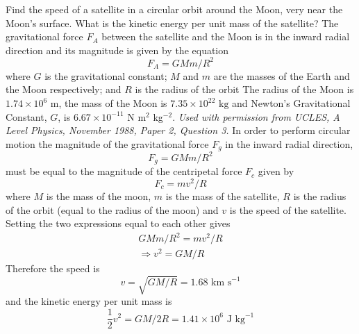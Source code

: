 \begin{hint}
{Find the speed of a satellite in a circular orbit around the Moon, very near the Moon's surface. What is the kinetic energy per unit mass of the satellite?
The gravitational force $F_A$ between the satellite and the Moon is in the inward radial direction and its magnitude is given by the equation 
\begin{equation*}
F_A=GMm/R^2
\end{equation*}
where $G$ is the gravitational constant; $M$ and $m$ are the masses of the Earth and the Moon respectively; and $R$ is the radius of the orbit}
{The radius of the Moon is $1.74\times 10^6\textrm{ m}$, the mass of the Moon is $7.35\times 10^{22}\textrm{ kg}$ and Newton's Gravitational Constant, $G$, is $6.67 \times 10^{-11}$ N m$^{2}$ kg$^{-2}$.}
{\textit{Used with permission from UCLES, A Level Physics, November 1988, Paper 2, Question 3.}}
{In order to perform circular motion the magnitude of the gravitational force $F_g$ in the inward radial direction, 
\begin{equation*} F_g=GMm/R^2 \end{equation*}
must be equal to the magnitude of the centripetal force $F_c$ given by 
\begin{equation*} F_c=mv^2/R \end{equation*}
where $M$ is the mass of the moon, $m$ is the mass of the satellite, $R$ is the radius of the orbit (equal to the radius of the moon) and $v$ is the speed of the satellite. Setting the two expressions equal to each other gives
\begin{align*} GMm/R^2=mv^2/R \\ \Rightarrow v^2=GM/R \end{align*}
Therefore the speed is 
\begin{equation*} v=\sqrt{GM/R}=1.68\textrm{ km s}^{-1} \end{equation*} 
and the kinetic energy per unit mass is \begin{equation*} \frac{1}{2}v^2=GM/2R=1.41\times 10^6\textrm{ J kg}^{-1} \end{equation*}
}
\end{hint}